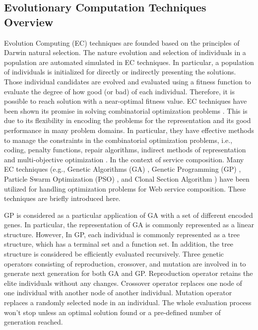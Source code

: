 \subsection{Evolutionary Computation Techniques Overview}\label{ec}

Evolution Computing (EC) techniques are founded based on the principles of Darwin natural selection. The nature evolution and selection of individuals in a population are automated simulated in EC techniques. In particular, a population of individuals is initialized for directly or indirectly presenting the solutions. Those individual candidates are evolved and evaluated using a fitness function to evaluate the degree of how good (or bad) of each individual. Therefore, it is possible to reach solution with a near-optimal fitness value. EC techniques have been shown its promise in solving combinatorial optimization problems \cite{back1997evolutionary}. This is due to its flexibility in encoding the problems for the representation and its good performance in many problem domains. In particular, they have effective methods to manage the constraints in the combinatorial optimization problems, i.e., coding, penalty functions, repair algorithms, indirect methods of representation and multi-objective optimization \cite{fleming2002evolutionary}. In the context of service composition. Many EC techniques (e.g., Genetic Algorithms (GA) \cite{whitley1994genetic}, Genetic Programming (GP) \cite{koza1992genetic}, Particle Swarm Optimization (PSO) \cite{kennedy1995particle}, and Clonal Section Algorithm \cite{de2002learning}) have been utilized for handling optimization problems for Web service composition. These techniques are briefly introduced here.

GP is considered as a particular application of GA with a set of different encoded genes. In particular, the representation of GA is commonly represented as a linear structure. However, In GP, each individual is commonly represented as a tree structure, which has a terminal set and a function set. In addition, the tree structure is considered be efficiently evaluated recursively. Three genetic operators consisting of reproduction, crossover, and mutation are involved in to generate next generation for both GA and GP. Reproduction operator retains the elite individuals without any changes. Crossover operator replaces one node of one individual with another node of another individual. Mutation operator replaces a randomly selected node in an individual. The whole evaluation process won't stop unless an optimal solution found or a pre-defined number of generation reached.

